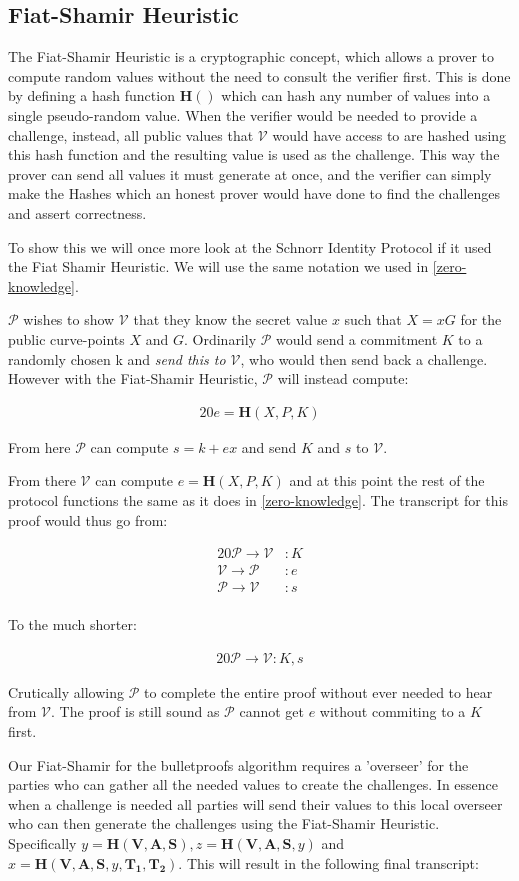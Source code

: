 \documentclass{article}
\newcommand{\eq}[1]{\begin{alignat*}{20}#1\end{alignat*}}
\renewcommand{\vec}[1]{\boldsymbol{#1}}
\newcommand{\V}{\mathcal{V}}
\renewcommand{\P}{\mathcal{P}}
\begin{document}
\subsection{Fiat-Shamir Heuristic}\label{fiat-shamir-heuristic}

The Fiat-Shamir Heuristic is a cryptographic concept, which allows a
prover to compute random values without the need to consult the verifier
first. This is done by defining a hash function $\textbf{H}()$ which
can hash any number of values into a single pseudo-random value. When
the verifier would be needed to provide a challenge, instead, all
public values that $\V$ would have access to are hashed using this
hash function and the resulting value is used as the challenge. This
way the prover can send all values it must generate at once, and the
verifier can simply make the Hashes which an honest prover would have
done to find the challenges and assert correctness.

To show this we will once more look at the Schnorr Identity Protocol
if it used the Fiat Shamir Heuristic. We will use the same notation
we used in \ref{zero-knowledge}.

$\P$ wishes to show $\V$ that they know the secret value $x$ such that
$X = xG$ for the public curve-points $X$ and $G$. Ordinarily $\P$
would send a commitment $K$ to a randomly chosen k and \textit{send
this to $\V$}, who would then send back a challenge. However with the
Fiat-Shamir Heuristic, $\P$ will instead compute:

\eq{
	e = \textbf{H}(X,P,K)
}

From here $\P$ can compute $s = k + ex$ and send $K$ and $s$ to $\V$.

From there $\V$ can compute $e = \textbf{H}(X,P,K)$ and at this
point the rest of the protocol functions the same as it does in
\ref{zero-knowledge}. The transcript for this proof would thus go from:

\eq{
	\P \rightarrow \V &: K \\
	\V \rightarrow \P &: e \\
	\P \rightarrow \V &: s \\
}

To the much shorter:

\eq{
	\P \rightarrow \V: K, s
}

Crutically allowing $\P$ to complete the entire proof without ever
needed to hear from $\V$. The proof is still sound as $\P$ cannot get
$e$ without commiting to a $K$ first.

Our Fiat-Shamir for the bulletproofs algorithm requires a
'overseer' for the parties who can gather all the needed values
to create the challenges. In essence when a challenge is needed
all parties will send their values to this local overseer
who can then generate the challenges using the Fiat-Shamir
Heuristic. Specifically $y = \textbf{H}(\vec{V},\vec{A},\vec{S}),
z = \textbf{H}(\vec{V},\vec{A},\vec{S}, y)$ and $x =
\textbf{H}(\vec{V},\vec{A},\vec{S}, y, \vec{T_1},\vec{T_2})$. This
will result in the following final transcript:
\end{document}

